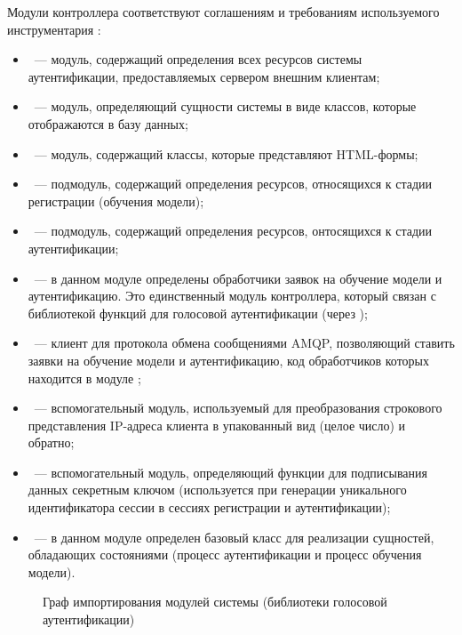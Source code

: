 Модули контроллера соответствуют соглашениям и требованиям используемого
инструментария :
\begin{itemize}
\item {}~--- модуль, содержащий определения всех ресурсов системы
аутентификации,
предоставляемых сервером внешним клиентам;
\item {}~--- модуль, определяющий сущности системы в виде классов,
которые отображаются в базу данных;
\item {}~--- модуль, содержащий классы, которые представляют
HTML-формы;
\item {}~--- подмодуль, содержащий определения ресурсов,
относящихся к стадии регистрации (обучения модели);
\item {}~--- подмодуль, содержащий определения ресурсов,
онтосящихся к стадии аутентификации;
\item {}~--- в данном модуле определены обработчики заявок на
обучение модели и аутентификацию. Это единственный модуль контроллера, который
связан с библиотекой функций для голосовой аутентификации (через
);
\item {}~--- клиент для протокола обмена сообщениями AMQP, позволяющий
ставить заявки на обучение модели и аутентификацию, код обработчиков которых
находится в модуле ;
\item {}~--- вспомогательный модуль, используемый для преобразования
строкового представления IP-адреса клиента в упакованный вид (целое число) и
обратно;
\item {}~--- вспомогательный модуль, определяющий функции для
подписывания данных секретным ключом (используется при генерации уникального
идентификатора сессии в сессиях регистрации и аутентификации);
\item {}~--- в данном модуле определен базовый класс
для реализации сущностей, обладающих состояниями (процесс аутентификации и
процесс обучения модели).
\end{itemize}

\begin{figure}[htp!]
\scalebox{0.75}{
\begin{sideways}

\end{sideways}
}
\caption{Граф импортирования модулей системы (библиотеки голосовой
аутентификации)}
\label{fig:import_graph_verispeak}
\end{figure}

